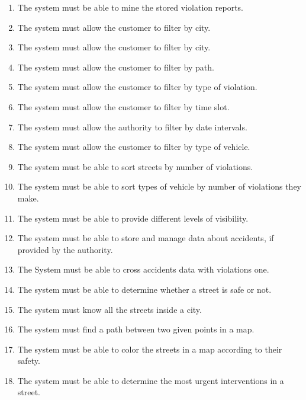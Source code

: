 \begin{enumerate}[label=\textbf{R\arabic*}]
			\item \label{req:mineData} The system must be able to mine the stored violation reports.
			\item \label{req:cityFilter} The system must allow the customer to filter by city.
			\item \label{req:streetFilter} The system must allow the customer to filter by city.
			\item \label{req:pathFilter} The system must allow the customer to filter by path.
			\item \label{req:violationFilter} The system must allow the customer to filter by type of violation.
			\item \label{req:timeFilter} The system must allow the customer to filter by time slot.
			\item \label{req:dateFilter} The system must allow the authority to filter by date intervals.
			\item \label{req:vehicleFilter} The system must allow the customer to filter by type of vehicle.
			\item \label{req:sortedResult} The system must be able to sort streets by number of violations.
			\item \label{req:sortedVehicles} The system must be able to sort types of vehicle by number of violations they make.
			\item \label{req:visibility} The system must be able to provide different levels of visibility.
			\item \label{req:accidentsData} The system must be able to store and manage data about accidents, if provided by the authority.
			\item \label{req:crossData} The System must be able to cross accidents data with violations one.
			\item \label{req:safeStreet} The system must be able to determine whether a street is safe or not.
			\item \label{req:cityStreets} The system must know all the streets inside a city.
			\item \label{req:pathFinder} The system must find a path between two given points in a map.
			\item \label{req:colorMap} The system must be able to color the streets in a map according to their safety.
			\item \label{req:interventions} The system must be able to determine the most urgent interventions in a street.	
		\end{enumerate}
	
